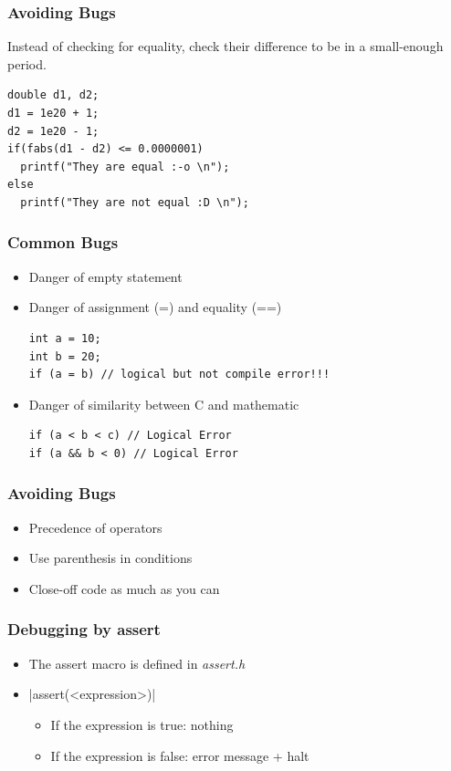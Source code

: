 \documentclass{../c-lecture}
\begin{document}
\begin{frame}[fragile]
  \frametitle{Avoiding Bugs}
  \begin{block}{}
    Instead of checking for equality, check their difference to be in a
    small-enough period.
  \end{block}
  \begin{verbatim}
double d1, d2;
d1 = 1e20 + 1;
d2 = 1e20 - 1;
if(fabs(d1 - d2) <= 0.0000001)
  printf("They are equal :-o \n");
else
  printf("They are not equal :D \n");
  \end{verbatim}
\end{frame}

\begin{frame}[fragile]
  \frametitle{Common Bugs}
  \begin{itemize}
    \item Danger of empty statement
    \item Danger of assignment (=) and equality (==)
    \begin{verbatim}
int a = 10;
int b = 20;
if (a = b) // logical but not compile error!!!
    \end{verbatim}
    \item Danger of similarity between C and mathematic
    \begin{verbatim}
if (a < b < c) // Logical Error
if (a && b < 0) // Logical Error
    \end{verbatim}
  \end{itemize}
\end{frame}

\begin{frame}
  \frametitle{Avoiding Bugs}
  \begin{itemize}
    \item Precedence of operators
    \item Use parenthesis in conditions
    \item Close-off code as much as you can
  \end{itemize}
\end{frame}

\begin{frame}
  \frametitle{Debugging by assert}
  \begin{itemize}
    \item
      The assert macro is defined in \textit{\color{Orange} assert.h}
    \item {}|assert(<expression>)|
    \begin{itemize}
      \item If the expression is true: nothing
      \item If the expression is false: error message + halt
    \end{itemize}
  \end{itemize}
\end{frame}
\end{document}

